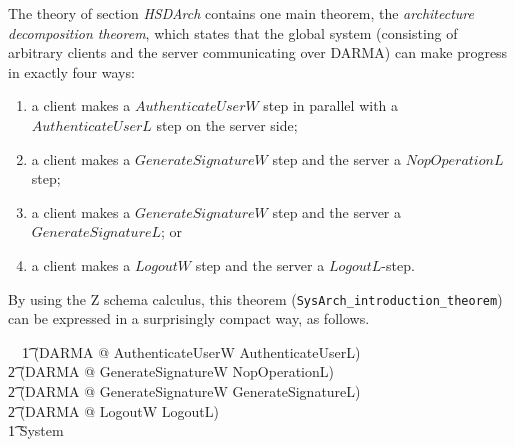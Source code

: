 \documentclass[a4paper,pdftex]{article}
\def\inlinesml{\lstinline[style=sml]}
\newcommand{\turnstile}{\vdash \, \,}
\begin{document}
The theory of section \emph{HSDArch} contains one main theorem,
the \emph{architecture decomposition theorem}, which states that the global 
system (consisting of arbitrary clients and the
server communicating over DARMA) can make progress in exactly four
ways:
\begin{enumerate}
\item a client makes a $AuthenticateUserW$ step in parallel
      with a $AuthenticateUserL$ step on the server side;
\item a client makes a $GenerateSignatureW$ step and the server
      a $NopOperationL$ step;
\item a client makes a $GenerateSignatureW$ step and the server
      a $GenerateSignatureL$; or
\item a client makes a $LogoutW$ step and the server a 
      $LogoutL$-step.
\end{enumerate}
By using the Z schema calculus, this theorem (\inlinesml{SysArch_introduction_theorem}) can be expressed in a surprisingly compact way, as follows.
\newenvironment{zedUnchecked}{\begin{zed}}{\end{zed}}
\begin{zedUnchecked} 
\turnstile 
\t1\;\; (\exists DARMA @   AuthenticateUserW \land AuthenticateUserL) \lor    \\
\t2     (\exists DARMA @   GenerateSignatureW \land NopOperationL) \lor       \\
\t2     (\exists DARMA @   GenerateSignatureW \land GenerateSignatureL) \lor  \\
\t2     (\exists DARMA @   LogoutW \land LogoutL)                             \\
\t1     \implies  \; \; System
\end{zedUnchecked}
\end{document}
